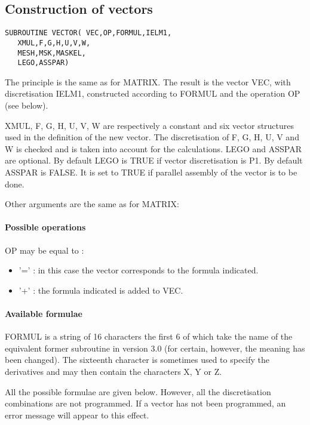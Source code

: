 \subsection{Construction of vectors}

\begin{lstlisting}[language=TelFortran]
SUBROUTINE VECTOR( VEC,OP,FORMUL,IELM1,
   XMUL,F,G,H,U,V,W,
   MESH,MSK,MASKEL,
   LEGO,ASSPAR)
\end{lstlisting}

The principle is the same as for MATRIX. The result is the vector VEC, with
discretisation IELM1, constructed according to FORMUL and the operation OP (see
below).

XMUL, F, G, H, U, V, W are respectively a constant and six vector structures
used in the definition of the new vector. The discretisation of F, G, H, U, V
and W is checked and is taken into account for the calculations.
LEGO and ASSPAR are optional.
By default LEGO is TRUE if vector discretisation is P1.
By default ASSPAR is FALSE.
It is set to TRUE if parallel assembly of the vector is to be done.

Other arguments are the same as for MATRIX:

\paragraph{Possible operations}

OP may be equal to :
\begin{itemize}
  \item '=' : in this case the vector corresponds to the formula indicated.
  \item '+' : the formula indicated is added to VEC.
\end{itemize}

\paragraph{Available formulae}

FORMUL is a string of 16 characters the first 6 of which take the name of the
equivalent former subroutine in \bief version 3.0 (for certain, however, the
meaning has been changed). The sixteenth character is sometimes used to specify
the derivatives and may then contain the characters X, Y or Z.

All the possible formulae are given below. However, all the discretisation
combinations are not programmed. If a vector has not been programmed, an error
message will appear to this effect.

